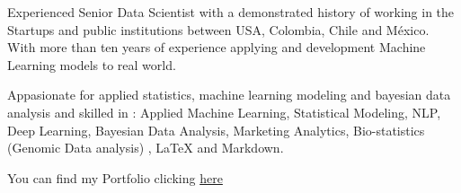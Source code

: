 

\begin{cvparagraph}

Experienced Senior Data Scientist with a demonstrated history of working in the Startups and public institutions between USA, Colombia, Chile and México. With more than ten years of experience applying and development Machine Learning models to real world.

Appasionate for applied statistics, machine learning modeling and bayesian data analysis and skilled in : Applied Machine Learning, Statistical Modeling, NLP, Deep Learning, Bayesian Data Analysis, Marketing Analytics, Bio-statistics (Genomic Data analysis) , LaTeX and Markdown.


You can find my Portfolio clicking \textcolor{red}{\href{https://github.com/carlosjimenez88M/Portfolio/blob/gh-pages/index.md}{here}}
\end{cvparagraph}
